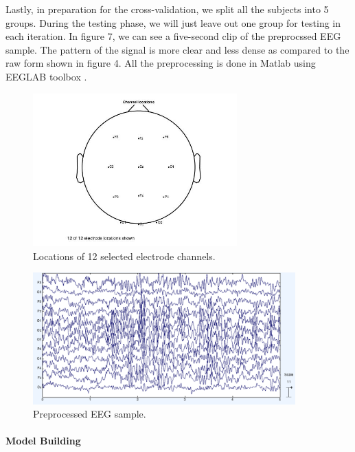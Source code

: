 \documentclass[a4paper,11pt,oneside]{article}
\begin{document}
	Lastly, in preparation for the  cross-validation, we split all the subjects into 5 groups. During the testing phase, we will just leave out one group for testing in each iteration. In figure 7, we can see a five-second clip of the preprocssed EEG sample. The pattern of the signal is more clear and less dense as compared to the raw form shown in figure 4. All the preprocessing is done in Matlab using EEGLAB toolbox \cite{delorme2004eeglab}.
	\begin{figure}[!h]
		\begin{center}
			\includegraphics[width=0.7\textwidth]{img/chanLocation}
		\end{center}
		\caption{Locations of 12 selected electrode channels.}
	\end{figure}
			\begin{figure}[!h]
	\begin{center}
		\includegraphics[width=0.9\textwidth]{img/processed}
	\end{center}
	\caption{Preprocessed EEG sample.}
	\end{figure}

\paragraph{Model Building} 
\end{document}
